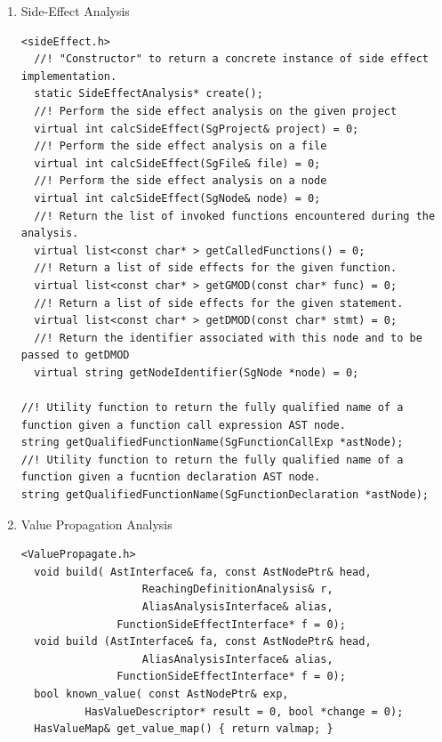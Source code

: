 \begin{enumerate}
\begin{enumerate}
\begin{lstlisting}
  virtual void contrl_flow(Stmt stmt1, Stmt stmt2, CFGConfig::EdgeType t) {}

      \end{lstlisting}


      \item Side-Effect Analysis
      \begin{lstlisting}
<sideEffect.h>
  //! "Constructor" to return a concrete instance of side effect implementation.
  static SideEffectAnalysis* create();
  //! Perform the side effect analysis on the given project
  virtual int calcSideEffect(SgProject& project) = 0;
  //! Perform the side effect analysis on a file
  virtual int calcSideEffect(SgFile& file) = 0;
  //! Perform the side effect analysis on a node
  virtual int calcSideEffect(SgNode& node) = 0;
  //! Return the list of invoked functions encountered during the analysis.
  virtual list<const char* > getCalledFunctions() = 0;
  //! Return a list of side effects for the given function.
  virtual list<const char* > getGMOD(const char* func) = 0;
  //! Return a list of side effects for the given statement.
  virtual list<const char* > getDMOD(const char* stmt) = 0;
  //! Return the identifier associated with this node and to be passed to getDMOD
  virtual string getNodeIdentifier(SgNode *node) = 0;

//! Utility function to return the fully qualified name of a function given a function call expression AST node.
string getQualifiedFunctionName(SgFunctionCallExp *astNode);
//! Utility function to return the fully qualified name of a function given a fucntion declaration AST node.
string getQualifiedFunctionName(SgFunctionDeclaration *astNode);
      \end{lstlisting}

      \item Value Propagation Analysis
      \begin{lstlisting}
<ValuePropagate.h>
  void build( AstInterface& fa, const AstNodePtr& head,
                   ReachingDefinitionAnalysis& r, 
                   AliasAnalysisInterface& alias,
	           FunctionSideEffectInterface* f = 0);
  void build (AstInterface& fa, const AstNodePtr& head, 
                   AliasAnalysisInterface& alias,
	           FunctionSideEffectInterface* f = 0);
  bool known_value( const AstNodePtr& exp, 
 		  HasValueDescriptor* result = 0, bool *change = 0);
  HasValueMap& get_value_map() { return valmap; }

      \end{lstlisting}




\end{enumerate}
\end{enumerate}

